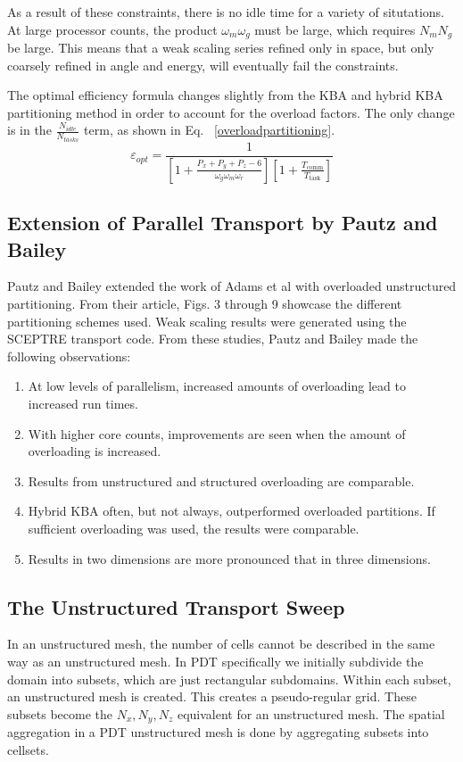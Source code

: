 \documentclass[11pt, letterpaper,titlepage,oneside]{article}
\begin{document}
As a result of these constraints, there is no idle time for a variety of situtations. At large processor counts, the product $\omega_m \omega_g$ must be large, which requires $N_m N_g$ be large. This means that a weak scaling series refined only in space, but only coarsely refined in angle and energy, will eventually fail the constraints.

The optimal efficiency formula changes slightly from the KBA and hybrid KBA partitioning method in order to account for the overload factors. The only change is in the $\frac{N_{idle}}{N_{tasks}}$ term, as shown in Eq. ~\eqref{overloadpartitioning}. 
\begin{equation}
\varepsilon_{opt} = \frac{1}{[1+\frac{P_x+P_y+P_z-6}{\omega_g \omega_m \omega_r}][1+\frac{T_{\text{comm}}}{T_{\text{task}}}]}
\label{overloadpartitioning}
\end{equation}

\subsection{Extension of Parallel Transport by Pautz and Bailey}
Pautz and Bailey\cite{PautzBailey} extended the work of Adams et al with overloaded unstructured partitioning. From their article, Figs. 3 through 9\cite{PautzBailey} showcase the different partitioning schemes used.  Weak scaling results were generated using the SCEPTRE transport code\cite{sceptre}. From these studies, Pautz and Bailey made the following observations:
\begin{enumerate}
	\item At low levels of parallelism, increased amounts of overloading lead to increased run times.
	\item With higher core counts, improvements are seen when the amount of overloading is increased.
	\item Results from unstructured and structured overloading are comparable. 
	\item Hybrid KBA often, but not always, outperformed overloaded partitions. If sufficient overloading was used, the results were comparable.
	\item Results in two dimensions are more pronounced that in three dimensions.
\end{enumerate}


\subsection{The Unstructured Transport Sweep}
In an unstructured mesh, the number of cells cannot be described in the same way as an unstructured mesh. In PDT specifically we initially subdivide the domain into subsets, which are just rectangular subdomains. Within each subset, an unstructured mesh is created. This creates a pseudo-regular grid. These subsets become the $N_x, N_y, N_z$ equivalent for an unstructured mesh. The spatial aggregation in a PDT unstructured mesh is done by aggregating subsets into cellsets. 
\end{document}
